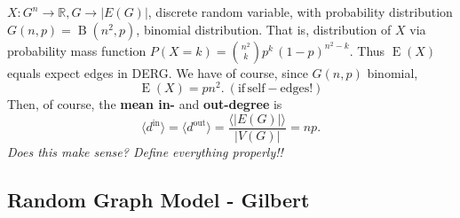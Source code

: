 \begin{remark}
  $X: G^n \to \mathbb{R}, G \to |E(G)|$, discrete random variable,
  with probability distribution $G(n,p) =\operatorname{B}(n^2,p)$,
  binomial distribution. That is, distribution of $X$ via probability
  mass function $P(X=k) = {{n^2} \choose k} p^k\,(1-p)^{n^2-k}$. Thus
  $\operatorname{E}(X)$ equals expect edges in DERG. We have of
  course, since $G(n,p)$ binomial,
  \[
  \operatorname{E}(X) = pn^2. \mathrm{\:(if\,self-edges!)}
  \]
  Then, of course, the \textbf{mean in-}  and \textbf{out-degree} is \[ \langle
  d^{\mathrm{in}} \rangle = \langle d^{\mathrm{out}} \rangle =
  \frac{\langle |E(G)| \rangle}{|V(G)|} = np.\] \textit{Does this make
    sense? Define everything properly!!}
\end{remark}

\subsection{Random Graph Model - Gilbert}\label{sec:gilbert_graph}



% 






